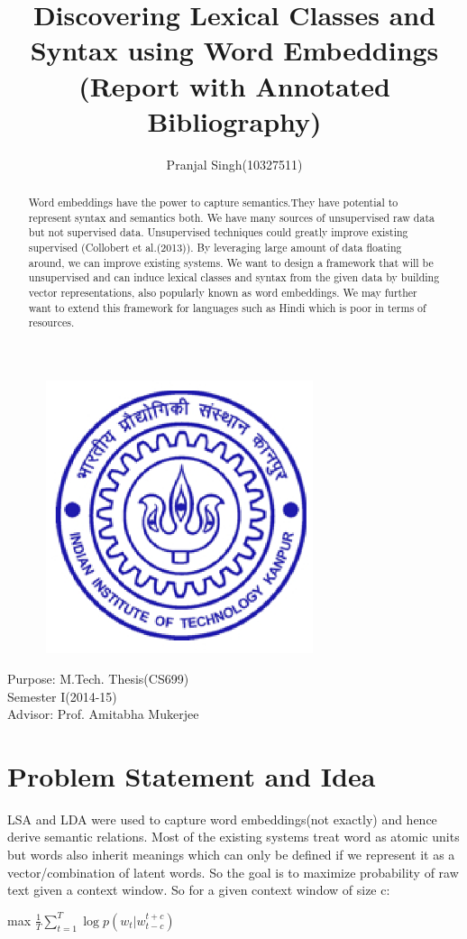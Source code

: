 \documentclass{article}
\title{\textbf{Discovering Lexical Classes and Syntax using Word Embeddings\\ (Report with Annotated Bibliography)}}
\author{\normalsize Pranjal Singh(10327511)\\}
\begin{document}
\maketitle
\begin{figure}[h!tb]
\centering
\includegraphics[width=8cm,height=8cm]{6.eps}
\end{figure}
\vspace{5cm}
\begin{center}
\large{
Purpose: M.Tech. Thesis(CS699)\\Semester I(2014-15)\\
Advisor: Prof. Amitabha Mukerjee}
\end{center}
\newpage

\begin{abstract}
Word embeddings have the power to capture semantics.They have potential to represent syntax and semantics both. We have many sources of unsupervised raw data but not supervised data. Unsupervised techniques could greatly improve existing supervised (Collobert et al.(2013)). By leveraging large amount of data floating around, we can improve existing systems. We want to design a framework that will be unsupervised and can induce lexical classes and syntax from the given data by building vector representations, also popularly known as word embeddings.
We may further want to extend this framework for languages such as Hindi which is poor in terms of resources.
\end{abstract}

\section{Problem Statement and Idea}
LSA and LDA were used to capture word embeddings(not exactly) and hence derive semantic relations. Most of the existing systems treat word as atomic units but words also inherit meanings which can only be defined if we represent it as a vector/combination of latent words. So the goal is to maximize probability of raw text given a context window.
So for a given context window of size c:
\begin{center} max $ \frac{1}{T}\sum_{t=1}^T \log p(w_t | w_{t-c}^{t+c}) $  \end{center}
\end{document}
